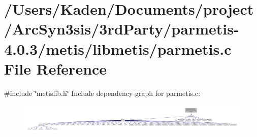 \hypertarget{a00939}{}\section{/\+Users/\+Kaden/\+Documents/project/\+Arc\+Syn3sis/3rd\+Party/parmetis-\/4.0.3/metis/libmetis/parmetis.c File Reference}
\label{a00939}
{\ttfamily \#include \char`\"{}metislib.\+h\char`\"{}}\newline
Include dependency graph for parmetis.\+c\+:\nopagebreak
\begin{figure}[H]
\begin{center}
\leavevmode
\includegraphics[width=350pt]{a00940}
\end{center}
\end{figure}
